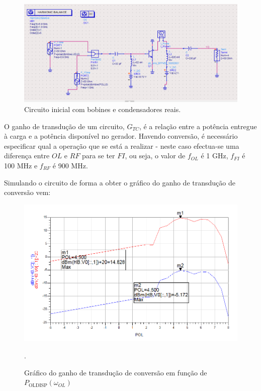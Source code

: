 \documentclass[11pt]{article}
\numberwithin{equation}{section}
\begin{document}
\begin{figure}[h]
\centering
\includegraphics[keepaspectratio=true, scale=0.45]{exps/Circuito_2c}
\vspace{-0.5em}
\caption{Circuito inicial com bobines e condensadores reais.}
\vspace{-0.8em}
\label{fig:Circuito_0}
\end{figure}

O ganho de transdução de um circuito, $G_{TC}$, é a relação entre a potência entregue à carga e a potência disponível no gerador. Havendo conversão, é necessário especificar qual a operação que se está a realizar - neste caso efectua-se uma diferença entre $OL$ e $RF$ para se ter $FI$, ou seja, o valor de $f_{OL}$ é 1 GHz, $f_{FI}$ é 100 MHz e $f_{RF}$ é 900 MHz. 

Simulando o circuito de forma a obter o gráfico do ganho de transdução de conversão vem:

\begin{figure}[h]
\centering
\includegraphics[keepaspectratio=true, scale=0.45]{exps/GT_0}
\vspace{-0.5em}
\caption{Gráfico do ganho de transdução de conversão em função de $ P_{\text{OLDISP}}\left(\omega_{OL}\right) $}.
\vspace{-0.8em}
\label{fig:GT_0}
\end{figure}
\end{document}
